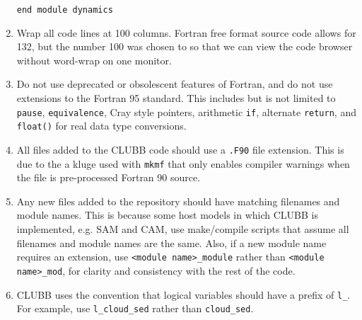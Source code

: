 \documentclass[letterpaper,12pt]{article}
\begin{document}
\begin{enumerate}
\verb|end module dynamics|

\item Wrap all code lines at 100 columns.  Fortran free format source code
allows for 132, but the number 100 was chosen to so that we can view the code 
browser without word-wrap on one monitor.

\item Do not use deprecated or obsolescent features of Fortran, and do not
use extensions to the Fortran 95 standard.  This includes but is not limited to
\texttt{pause}, \texttt{equivalence}, Cray style pointers, 
arithmetic \texttt{if}, alternate \texttt{return}, and \texttt{float()} for 
real data type conversions.

\item All files added to the CLUBB code should use a \texttt{.F90} file 
extension.  This is due to the a kluge used with \texttt{mkmf} that only enables
compiler warnings when the file is pre-processed Fortran 90 source. 

\item Any new files added to the repository should have matching filenames and module names. 
This is because some host models in which CLUBB is implemented, e.g. SAM and CAM, use 
make/compile scripts that assume all filenames and module names are the same.
Also, if a new module name requires an extension, use \verb|<module name>_module|
rather than \verb|<module name>_mod|, for clarity and consistency with the rest of the code. 

\item CLUBB uses the convention that logical variables should have a prefix of \verb|l_|.  For example,
use \verb|l_cloud_sed| rather than \verb|cloud_sed|.

\end{enumerate}
\end{document}
